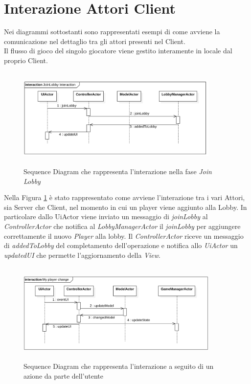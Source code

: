 \newpage
\section{Interazione Attori Client}
Nei diagrammi sottostanti sono rappresentati esempi di come avviene la comunicazione nel dettaglio tra gli attori presenti nel Client.\\
Il flusso di gioco del singolo giocatore viene gestito interamente in locale dal proprio Client.

\begin{figure}[ht]
\centering
\includegraphics[width=10cm, height=5cm]{img/LobbyInteraction.png}
\caption{Sequence Diagram che rappresenta l'interazione nella fase \textit{Join Lobby}}
\label{fig:ClasDiagRaprInterazJoinToLobby}
\end{figure}

Nella Figura \ref{fig:ClasDiagRaprInterazJoinToLobby} \`e stato rappresentato come avviene l'interazione tra i vari Attori, sia Server che Client, nel momento in cui un player viene aggiunto alla Lobby. In particolare dallo UiActor viene inviato un messaggio di \textit{joinLobby} al \textit{ControllerActor} che notifica al \textit{LobbyManagerActor} il \textit{joinLobby} per aggiungere correttamente il nuovo \textit{Player} alla lobby. Il \textit{ControllerActor} riceve un messaggio di \textit{addedToLobby} del completamento dell'operazione e notifica allo \textit{UiActor} un \textit{updatedUI} che permette l'aggiornamento della \textit{View}.

\begin{figure}[ht]
\centering
\includegraphics[width=10cm, height=5cm]{img/MyPlayerInteraction.png}
\caption{Sequence Diagram che rappresenta l'interazione a seguito di un azione da parte dell'utente}
\label{fig:ClasDiagRaprInterazDopoAzionUtent}
\end{figure}

